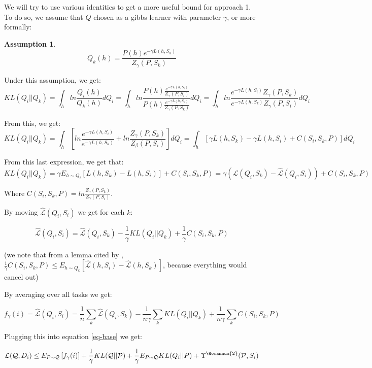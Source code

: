 \documentclass[letterpaper]{article}
\theoremstyle{definition}
\newtheorem{assumption}{Assumption}
\begin{document}
We will try to use various identities to get a more useful bound for approach 1. To do so, we assume that $Q$ chosen as a gibbs learner with parameter $\gamma$, or more formally:

\begin{assumption} \label{assumption-gibbs}
	$$Q_k(h) = \frac{P(h)e^{-\gamma L(h, S_k)}}{Z_{\gamma}(P, S_k)}$$
\end{assumption}

Under this assumption, we get: $$KL(Q_i||Q_k)=\int_h ln\frac{Q_i(h)}{Q_k(h)}dQ_i=\int_h ln\frac{P(h)\frac{e^{-\gamma L(h,S_i)}}{Z_{\gamma}(P,S_i)}}{P(h)\frac{e^{-\gamma L(h,S_k)}}{Z_{\gamma}(P,S_k)}}dQ_i=\int_h ln\frac{e^{-\gamma L(h,S_i)} Z_{\gamma}(P,S_k)}{e^{-\gamma L(h,S_k)} Z_{\gamma}(P,S_i)}dQ_i$$

From this, we get: 
$$KL(Q_i||Q_k)=\int_h \left [ ln\frac{e^{-\gamma L(h,S_i)}}{e^{-\gamma L(h,S_k)} }+ln \frac{Z_{\gamma}(P,S_k)}{Z_{\beta}(P,S_i)} \right ] dQ_i=\int_h \left [ \gamma L(h,S_k)-\gamma L(h,S_i) +C(S_i,S_k,P) \right ] dQ_i$$

From this last expression, we get that:
$$KL(Q_i||Q_k)=\gamma E_{h\sim Q_i}[L(h,S_k)-L(h,S_i)]+C(S_i,S_k,P)=\gamma (\hat{\mathcal{L}}(Q_i,S_k)-\hat{\mathcal{L}}(Q_i,S_i))+C(S_i,S_k,P)$$

Where $C(S_i,S_k,P)=ln\frac{Z_{\gamma}(P,S_k)}{ Z_{\gamma}(P,S_i)}$.

By moving $\hat{\mathcal{L}}(Q_i,S_i)$ we get for each $k$:

$$ \hat{\mathcal{L}}(Q_i,S_i)= \hat{\mathcal{L}}(Q_i,S_k) - \frac{1}{\gamma} KL(Q_i||Q_k) + \frac{1}{\gamma}C(S_i,S_k,P)$$

(we note that from a lemma cited by \cite{Rivasplata2020}, $\frac{1}{\gamma}C(S_i,S_k,P)\leq E_{h\sim Q_k}\left [\hat{\mathcal{L}}(h, S_i)-\hat{\mathcal{L}}(h, S_k)\right ]$, because everything would cancel out)

By averaging over all tasks we get:

\begin{equation}
f_{\gamma}(i)=\hat{\mathcal{L}}(Q_i,S_i)= \frac{1}{n}\sum_k\hat{\mathcal{L}}(Q_i,S_k) - \frac{1}{n\gamma} \sum_k KL(Q_i||Q_k) + \frac{1}{n\gamma}\sum_k C(S_i,S_k,P)
\end{equation}

Plugging this into equation \ref{eq-base} we get:

\begin{equation}
\mathcal{L}(\mathcal{Q}, D_i)\leq E_{P\sim \mathcal{Q}} \left [ f_{\gamma}(i) \right ]+ \frac{1}{\gamma}KL(\mathcal{Q}||\mathcal{P})+\frac{1}{\gamma} E_{P\sim \mathcal{Q}}KL(Q_i||P)+\Upsilon^{\text{\Romannum{2}}}(\mathcal{P}, S_i)
\end{equation}
\end{document}
